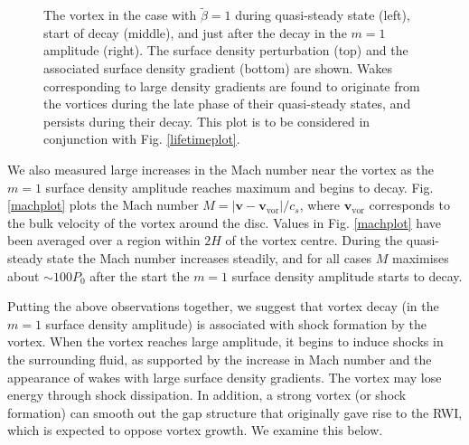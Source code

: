 \begin{figure}
{  }
  \hfill
  \caption{The vortex in the case with $\tilde{\beta}=1$
    during quasi-steady state (left), start of decay 
    (middle), and just after the decay in the $m=1$ amplitude
    (right). The surface density perturbation
    (top) and the associated surface density gradient (bottom) are
    shown. Wakes corresponding to large density gradients
    are found to originate from the vortices during the late phase of 
    their quasi-steady states, and persists during their decay. 
    This plot is to be considered in conjunction with
    Fig. \ref{lifetimeplot}. 
    \label{shockplot}}
\end{figure}

We also measured large increases in the Mach number near
the vortex as the $m=1$ surface density amplitude reaches maximum and begins to decay. 
Fig. \ref{machplot} plots the Mach number $M=|\bm{v} -
\bm{v}_\mathrm{vor}|/c_s$, where 
$\bm{v}_\mathrm{vor}$ corresponds to the bulk velocity of the vortex
around the disc. Values in Fig. \ref{machplot} have been averaged over
a region within $2H$ of the vortex centre. 
During the quasi-steady state the Mach number increases 
steadily, and for all cases $M$ maximises about
$\sim 100P_0$ after the start the $m=1$ surface density
amplitude starts to decay. 

Putting the above observations together, we suggest that vortex decay
(in the $m=1$ surface density amplitude) is associated with shock formation by
the vortex. When the vortex reaches large amplitude, it begins
to induce shocks in the surrounding fluid, as supported by the
increase in Mach number and the appearance of wakes with large surface
density gradients. The vortex may lose energy through shock
dissipation. In addition, a strong vortex (or shock formation) 
can smooth out the gap structure that originally gave rise to the
RWI, which is expected to oppose vortex growth. We examine this below.

